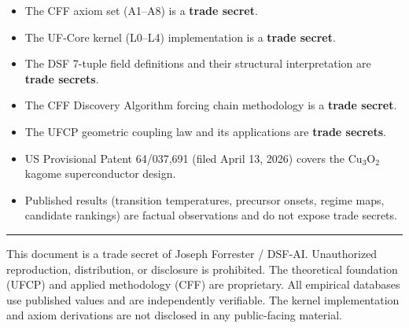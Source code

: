 \documentclass[11pt, a4paper]{article}
\begin{document}
\begin{itemize}[nosep]
  \item The CFF axiom set (A1--A8) is a \textbf{trade secret}.
  \item The UF-Core kernel (L0--L4) implementation is a
    \textbf{trade secret}.
  \item The DSF 7-tuple field definitions and their structural
    interpretation are \textbf{trade secrets}.
  \item The CFF Discovery Algorithm forcing chain methodology
    is a \textbf{trade secret}.
  \item The UFCP geometric coupling law and its applications
    are \textbf{trade secrets}.
  \item US Provisional Patent 64/037,691 (filed April 13, 2026)
    covers the Cu$_3$O$_2$ kagome superconductor design.
  \item Published results (transition temperatures, precursor
    onsets, regime maps, candidate rankings) are factual
    observations and do not expose trade secrets.
\end{itemize}

\vspace{2em}\hrule\vspace{0.5em}
{\color{nm-gray}\small This document is a trade secret of
Joseph Forrester / DSF-AI. Unauthorized reproduction,
distribution, or disclosure is prohibited. The theoretical
foundation (UFCP) and applied methodology (CFF) are proprietary.
All empirical databases use published values and are
independently verifiable. The kernel implementation and axiom
derivations are not disclosed in any public-facing material.}
\end{document}
